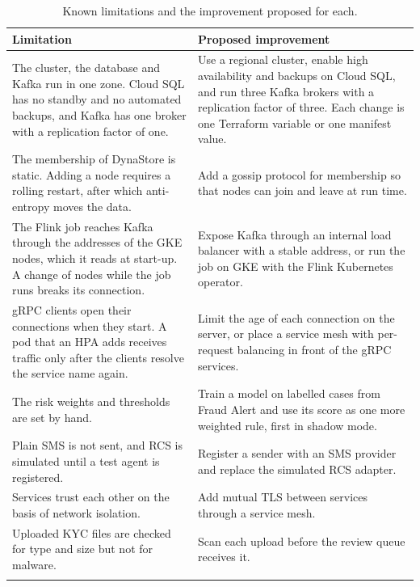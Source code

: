 \documentclass[11pt,a4paper]{article}
\begin{document}
\begin{table}[H]\centering\small
\caption{Known limitations and the improvement proposed for each.}\label{tab:limitations}
\begin{tabularx}{\linewidth}{@{}YY@{}}
\toprule
Limitation & Proposed improvement \\
\midrule
The cluster, the database and Kafka run in one zone. Cloud SQL has no standby and no automated backups, and Kafka has one broker with a replication factor of one. & Use a regional cluster, enable high availability and backups on Cloud SQL, and run three Kafka brokers with a replication factor of three. Each change is one Terraform variable or one manifest value. \\ \addlinespace[3pt]
The membership of DynaStore is static. Adding a node requires a rolling restart, after which anti-entropy moves the data. & Add a gossip protocol for membership so that nodes can join and leave at run time. \\ \addlinespace[3pt]
The Flink job reaches Kafka through the addresses of the GKE nodes, which it reads at start-up. A change of nodes while the job runs breaks its connection. & Expose Kafka through an internal load balancer with a stable address, or run the job on GKE with the Flink Kubernetes operator. \\ \addlinespace[3pt]
gRPC clients open their connections when they start. A pod that an HPA adds receives traffic only after the clients resolve the service name again. & Limit the age of each connection on the server, or place a service mesh with per-request balancing in front of the gRPC services. \\ \addlinespace[3pt]
The risk weights and thresholds are set by hand. & Train a model on labelled cases from Fraud Alert and use its score as one more weighted rule, first in shadow mode. \\ \addlinespace[3pt]
Plain SMS is not sent, and RCS is simulated until a test agent is registered. & Register a sender with an SMS provider and replace the simulated RCS adapter. \\ \addlinespace[3pt]
Services trust each other on the basis of network isolation. & Add mutual TLS between services through a service mesh. \\ \addlinespace[3pt]
Uploaded KYC files are checked for type and size but not for malware. & Scan each upload before the review queue receives it. \\ \addlinespace[3pt]
\bottomrule
\end{tabularx}
\end{table}
\end{document}
